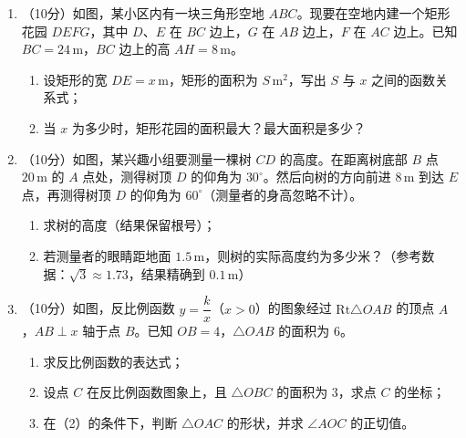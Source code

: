 \documentclass[12pt, a4paper]{ctexart}
\begin{document}
\begin{enumerate}[label=\arabic*., start=17]
\item （10分）如图，某小区内有一块三角形空地 $ABC$。现要在空地内建一个矩形花园 $DEFG$，其中 $D$、$E$ 在 $BC$ 边上，$G$ 在 $AB$ 边上，$F$ 在 $AC$ 边上。已知 $BC = 24\,\text{m}$，$BC$ 边上的高 $AH = 8\,\text{m}$。
\begin{enumerate}[label=(\arabic*)]
\item 设矩形的宽 $DE = x\,\text{m}$，矩形的面积为 $S\,\text{m}^2$，写出 $S$ 与 $x$ 之间的函数关系式；
\item 当 $x$ 为多少时，矩形花园的面积最大？最大面积是多少？
\end{enumerate}
\vspace{6cm}

\item （10分）如图，某兴趣小组要测量一棵树 $CD$ 的高度。在距离树底部 $B$ 点 $20\,\text{m}$ 的 $A$ 点处，测得树顶 $D$ 的仰角为 $30^\circ$。然后向树的方向前进 $8\,\text{m}$ 到达 $E$ 点，再测得树顶 $D$ 的仰角为 $60^\circ$（测量者的身高忽略不计）。
\begin{enumerate}[label=(\arabic*)]
\item 求树的高度（结果保留根号）；
\item 若测量者的眼睛距地面 $1.5\,\text{m}$，则树的实际高度约为多少米？（参考数据：$\sqrt{3} \approx 1.73$，结果精确到 $0.1\,\text{m}$）
\end{enumerate}
\vspace{6cm}

\item （10分）如图，反比例函数 $y = \dfrac{k}{x}$（$x > 0$）的图象经过 $\text{Rt}\triangle OAB$ 的顶点 $A$，$AB \perp x$ 轴于点 $B$。已知 $OB = 4$，$\triangle OAB$ 的面积为 $6$。
\begin{enumerate}[label=(\arabic*)]
\item 求反比例函数的表达式；
\item 设点 $C$ 在反比例函数图象上，且 $\triangle OBC$ 的面积为 $3$，求点 $C$ 的坐标；
\item 在（2）的条件下，判断 $\triangle OAC$ 的形状，并求 $\angle AOC$ 的正切值。
\end{enumerate}
\vspace{6cm}

\end{enumerate}
\end{document}
